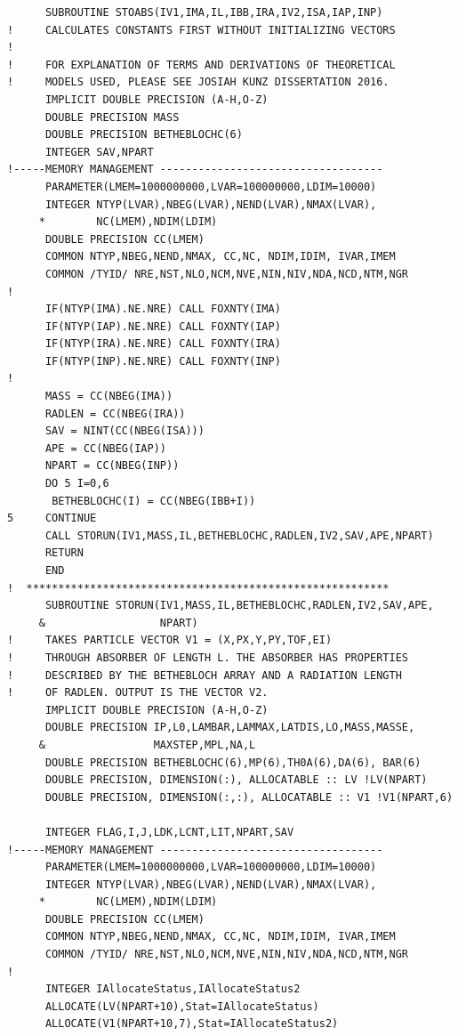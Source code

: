 \label{sec:fortran}
\begin{lstlisting}
      SUBROUTINE STOABS(IV1,IMA,IL,IBB,IRA,IV2,ISA,IAP,INP)
!     CALCULATES CONSTANTS FIRST WITHOUT INITIALIZING VECTORS
!
!     FOR EXPLANATION OF TERMS AND DERIVATIONS OF THEORETICAL
!     MODELS USED, PLEASE SEE JOSIAH KUNZ DISSERTATION 2016.
      IMPLICIT DOUBLE PRECISION (A-H,O-Z)
      DOUBLE PRECISION MASS
      DOUBLE PRECISION BETHEBLOCHC(6)
      INTEGER SAV,NPART
!-----MEMORY MANAGEMENT -----------------------------------
      PARAMETER(LMEM=1000000000,LVAR=100000000,LDIM=10000)
      INTEGER NTYP(LVAR),NBEG(LVAR),NEND(LVAR),NMAX(LVAR),
     *        NC(LMEM),NDIM(LDIM)
      DOUBLE PRECISION CC(LMEM)
      COMMON NTYP,NBEG,NEND,NMAX, CC,NC, NDIM,IDIM, IVAR,IMEM
      COMMON /TYID/ NRE,NST,NLO,NCM,NVE,NIN,NIV,NDA,NCD,NTM,NGR
!
      IF(NTYP(IMA).NE.NRE) CALL FOXNTY(IMA)
      IF(NTYP(IAP).NE.NRE) CALL FOXNTY(IAP)
      IF(NTYP(IRA).NE.NRE) CALL FOXNTY(IRA)
      IF(NTYP(INP).NE.NRE) CALL FOXNTY(INP)
!
      MASS = CC(NBEG(IMA))
      RADLEN = CC(NBEG(IRA))
      SAV = NINT(CC(NBEG(ISA)))
      APE = CC(NBEG(IAP))
      NPART = CC(NBEG(INP))
      DO 5 I=0,6
       BETHEBLOCHC(I) = CC(NBEG(IBB+I))
5     CONTINUE
      CALL STORUN(IV1,MASS,IL,BETHEBLOCHC,RADLEN,IV2,SAV,APE,NPART)
      RETURN
      END
!  *********************************************************
      SUBROUTINE STORUN(IV1,MASS,IL,BETHEBLOCHC,RADLEN,IV2,SAV,APE,
     &                  NPART)
!     TAKES PARTICLE VECTOR V1 = (X,PX,Y,PY,TOF,EI)
!     THROUGH ABSORBER OF LENGTH L. THE ABSORBER HAS PROPERTIES 
!     DESCRIBED BY THE BETHEBLOCH ARRAY AND A RADIATION LENGTH
!     OF RADLEN. OUTPUT IS THE VECTOR V2.
      IMPLICIT DOUBLE PRECISION (A-H,O-Z)
      DOUBLE PRECISION IP,L0,LAMBAR,LAMMAX,LATDIS,LO,MASS,MASSE,
     &                 MAXSTEP,MPL,NA,L
      DOUBLE PRECISION BETHEBLOCHC(6),MP(6),TH0A(6),DA(6), BAR(6)
      DOUBLE PRECISION, DIMENSION(:), ALLOCATABLE :: LV !LV(NPART)
      DOUBLE PRECISION, DIMENSION(:,:), ALLOCATABLE :: V1 !V1(NPART,6)

      INTEGER FLAG,I,J,LDK,LCNT,LIT,NPART,SAV
!-----MEMORY MANAGEMENT -----------------------------------
      PARAMETER(LMEM=1000000000,LVAR=100000000,LDIM=10000)
      INTEGER NTYP(LVAR),NBEG(LVAR),NEND(LVAR),NMAX(LVAR),
     *        NC(LMEM),NDIM(LDIM)
      DOUBLE PRECISION CC(LMEM)
      COMMON NTYP,NBEG,NEND,NMAX, CC,NC, NDIM,IDIM, IVAR,IMEM
      COMMON /TYID/ NRE,NST,NLO,NCM,NVE,NIN,NIV,NDA,NCD,NTM,NGR
!
      INTEGER IAllocateStatus,IAllocateStatus2
      ALLOCATE(LV(NPART+10),Stat=IAllocateStatus)
      ALLOCATE(V1(NPART+10,7),Stat=IAllocateStatus2)


\end{lstlisting}
